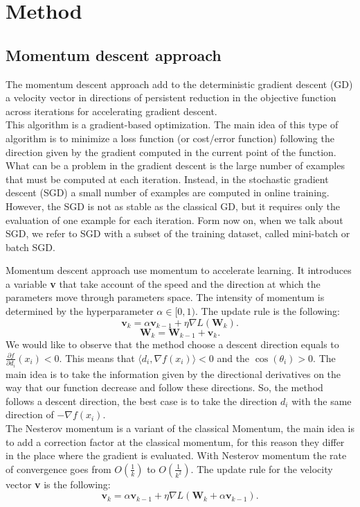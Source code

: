 \section{Method}

\subsection{Momentum descent approach}
\label{MDA}
The momentum descent approach add to the deterministic gradient descent (GD) a velocity vector in directions of persistent reduction in the objective function across iterations for accelerating gradient descent.
\\
This algorithm is a gradient-based optimization. The main idea of this type of algorithm is to minimize a loss function (or cost/error function) following the direction given by the gradient computed in the current point of the function.
\\
What can be a problem in the gradient descent is the large number of examples that must be computed at each iteration. Instead, in the stochastic gradient descent (SGD) a small number of examples  are computed in online training. However, the SGD is not as stable as the classical GD, but it requires only the evaluation of one example for each iteration. 
Form now on, when we talk about SGD, we refer to SGD with a subset of the training dataset, called mini-batch or batch SGD.

Momentum descent approach use momentum to accelerate learning. It introduces a variable \textbf{v} that take account of the speed and the direction at which the parameters move through parameters space. The intensity of momentum is determined by the hyperparameter $\alpha\in[0,1)$.
The update rule is the following:
\begin{equation}
\label{classical_momentum}
\textbf{v}_k = \alpha\textbf{v}_{k-1} + \eta\nabla\textit{L}(\textbf{W}_k).
\end{equation}
\begin{equation}
\label{update_momentum}
\textbf{W}_k = \textbf{W}_{k-1}  + \textbf{v}_k.
\end{equation}
We would like to observe that the method choose a descent direction equals to $\frac{\partial f}{\partial d_i}(x_i)<0$. This means that $\langle d_i, \nabla f(x_i)\rangle <0$ and the $\cos(\theta_i)>0$. The main idea is to take the information given by the directional derivatives on the way that our function decrease and follow these directions. So, the method follows a descent direction, the best case is to take the direction $d_i$ with the same direction of $-\nabla f(x_i)$.\\
The Nesterov momentum is a variant of the classical Momentum, the main idea is to add a correction factor at the classical momentum,  for this reason they differ in the place where the gradient is evaluated. With Nesterov momentum the rate of convergence goes from $O(\frac{1}{k})$ to $O(\frac{1}{k^2})$.
The update rule for the velocity vector \textbf{v} is the following:
\begin{equation}
\label{nesterov_momentum}
\textbf{v}_k = \alpha\textbf{v}_{k-1} + \eta\nabla\textit{L}(\textbf{W}_k + \alpha\textbf{v}_{k-1}).
\end{equation}

